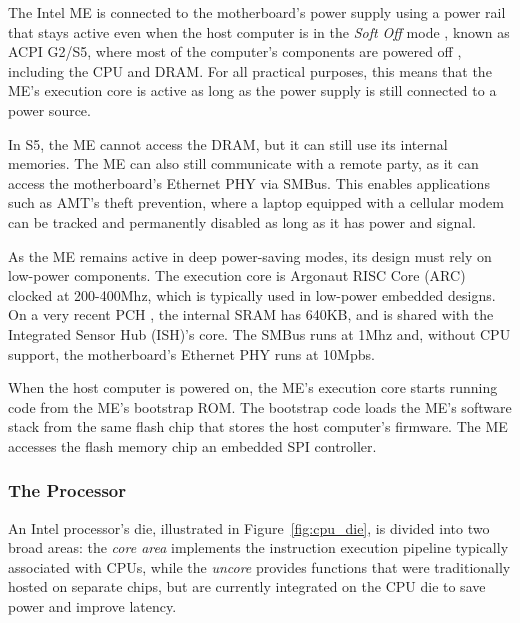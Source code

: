 
The Intel ME is connected to the motherboard's power supply using a power rail
that stays active even when the host computer is in the \textit{Soft Off} mode
\cite{intel2015chipset}, known as ACPI G2/S5, where most of the computer's
components are powered off \cite{intel2010power}, including the CPU and DRAM.
For all practical purposes, this means that the ME's execution core is active
as long as the power supply is still connected to a power source.

In S5, the ME cannot access the DRAM, but it can still use its internal
memories. The ME can also still communicate with a remote party, as it can
access the motherboard's Ethernet PHY via SMBus. This enables applications such
as AMT's theft prevention, where a laptop equipped with a cellular modem can be
tracked and permanently disabled as long as it has power and signal.

As the ME remains active in deep power-saving modes, its design must rely on
low-power components. The execution core is Argonaut RISC Core (ARC) clocked at
200-400Mhz, which is typically used in low-power embedded designs. On a very
recent PCH \cite{intel2015chipset}, the internal SRAM has 640KB, and is shared
with the Integrated Sensor Hub (ISH)'s core. The SMBus runs at 1Mhz and,
without CPU support, the motherboard's Ethernet PHY runs at 10Mpbs.

When the host computer is powered on, the ME's execution core starts running
code from the ME's bootstrap ROM. The bootstrap code loads the ME's software
stack from the same flash chip that stores the host computer's firmware. The
ME accesses the flash memory chip an embedded SPI controller.


\subsubsection{The Processor}
\label{sec:cpu_die}

An Intel processor's die, illustrated in Figure~\ref{fig:cpu_die}, is divided
into two broad areas: the \textit{core area} implements the instruction
execution pipeline typically associated with CPUs, while the \textit{uncore}
provides functions that were traditionally hosted on separate chips, but are
currently integrated on the CPU die to save power and improve latency.


